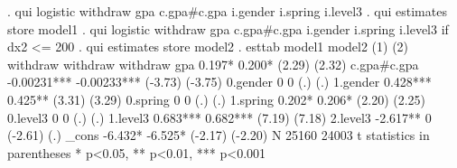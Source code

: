 . qui logistic withdraw gpa c.gpa\#c.gpa i.gender i.spring i.level3
{\smallskip}
. qui estimates store model1
{\smallskip}
. qui logistic withdraw gpa c.gpa\#c.gpa i.gender i.spring i.level3 if dx2 <= 200
{\smallskip}
. qui estimates store model2
{\smallskip}
. esttab model1 model2
{\smallskip}
                      (1)             (2)   
                 withdraw        withdraw   
withdraw                                    
gpa                 0.197*          0.200*  
                   (2.29)          (2.32)   
{\smallskip}
c.gpa\#c.gpa      -0.00231***     -0.00233***
                  (-3.73)         (-3.75)   
{\smallskip}
0.gender                0               0   
                      (.)             (.)   
{\smallskip}
1.gender            0.428***        0.425** 
                   (3.31)          (3.29)   
{\smallskip}
0.spring                0               0   
                      (.)             (.)   
{\smallskip}
1.spring            0.202*          0.206*  
                   (2.20)          (2.25)   
{\smallskip}
0.level3                0               0   
                      (.)             (.)   
{\smallskip}
1.level3            0.683***        0.682***
                   (7.19)          (7.18)   
{\smallskip}
2.level3           -2.617**             0   
                  (-2.61)             (.)   
{\smallskip}
_cons              -6.432*         -6.525*  
                  (-2.17)         (-2.20)   
N                   25160           24003   
t statistics in parentheses
* p<0.05, ** p<0.01, *** p<0.001
{\smallskip}
